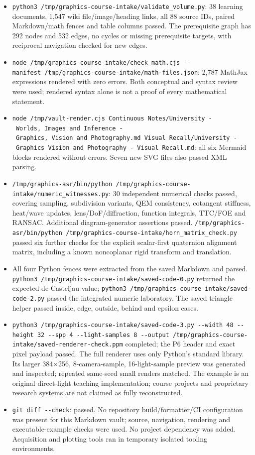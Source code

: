 \begin{itemize}
\tightlist
\item
  \texttt{python3\ /tmp/graphics-course-intake/validate\_volume.py}: 38 learning documents, 1,547 wiki file/image/heading links, all 88 source IDs, paired Markdown/math fences and table columns passed. The prerequisite graph has 292 nodes and 532 edges, no cycles or missing prerequisite targets, with reciprocal navigation checked for new edges.
\item
  \texttt{node\ /tmp/graphics-course-intake/check\_math.cjs\ -\/-manifest\ /tmp/graphics-course-intake/math-files.json}: 2,787 MathJax expressions rendered with zero errors. Both conceptual and syntax review were used; rendered syntax alone is not a proof of every mathematical statement.
\item
  \texttt{node\ /tmp/vault-render.cjs\ \textquotesingle{}Continuous\ Notes/University\ -\ Worlds,\ Images\ and\ Inference\ -\ Graphics,\ Vision\ and\ Photography.md\textquotesingle{}\ \textquotesingle{}Visual\ Recall/University\ -\ Graphics\ Vision\ and\ Photography\ -\ Visual\ Recall.md\textquotesingle{}}: all six Mermaid blocks rendered without errors. Seven new SVG files also passed XML parsing.
\item
  \texttt{/tmp/graphics-asr/bin/python\ /tmp/graphics-course-intake/numeric\_witnesses.py}: 30 independent numerical checks passed, covering sampling, subdivision variants, QEM consistency, cotangent stiffness, heat/wave updates, lens/DoF/diffraction, function integrals, TTC/FOE and RANSAC. Additional diagram-generator assertions passed. \texttt{/tmp/graphics-asr/bin/python\ /tmp/graphics-course-intake/horn\_matrix\_check.py} passed six further checks for the explicit scalar-first quaternion alignment matrix, including a known noncoplanar rigid transform and translation.
\item
  All four Python fences were extracted from the saved Markdown and parsed. \texttt{python3\ /tmp/graphics-course-intake/saved-code-0.py} returned the expected de Casteljau value; \texttt{python3\ /tmp/graphics-course-intake/saved-code-2.py} passed the integrated numeric laboratory. The saved triangle helper passed inside, edge, outside, behind and epsilon cases.
\item
  \texttt{python3\ /tmp/graphics-course-intake/saved-code-3.py\ -\/-width\ 48\ -\/-height\ 32\ -\/-spp\ 4\ -\/-light-samples\ 8\ -\/-output\ /tmp/graphics-course-intake/saved-renderer-check.ppm} completed; the P6 header and exact pixel payload passed. The full renderer uses only Python's standard library. Its larger 384×256, 8-camera-sample, 16-light-sample preview was generated and inspected; repeated same-seed small renders matched. The example is an original direct-light teaching implementation; course projects and proprietary research systems are not claimed as fully reconstructed.
\item
  \texttt{git\ diff\ -\/-check}: passed. No repository build/formatter/CI configuration was present for this Markdown vault; source, navigation, rendering and executable-example checks were used. No project dependency was added. Acquisition and plotting tools ran in temporary isolated tooling environments.
\end{itemize}

